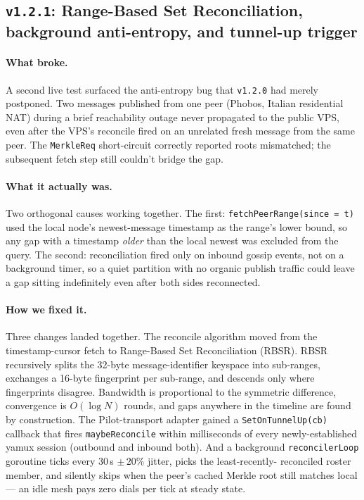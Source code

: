 \documentclass[11pt,a4paper]{article}
\begin{document}
\subsection{\texttt{v1.2.1}: Range-Based Set Reconciliation,
background anti-entropy, and tunnel-up trigger}

\paragraph{What broke.} A second live test surfaced the
anti-entropy bug that \texttt{v1.2.0} had merely postponed. Two
messages published from one peer (Phobos, Italian residential
NAT) during a brief reachability outage never propagated to the
public VPS, even after the VPS's reconcile fired on an unrelated
fresh message from the same peer. The \texttt{MerkleReq}
short-circuit correctly reported roots mismatched; the
subsequent fetch step still couldn't bridge the gap.

\paragraph{What it actually was.} Two orthogonal causes working
together. The first: \texttt{fetchPeerRange(since = t)} used
the local node's newest-message timestamp as the range's lower
bound, so any gap with a timestamp \emph{older} than the local
newest was excluded from the query. The second: reconciliation
fired only on inbound gossip events, not on a background timer,
so a quiet partition with no organic publish traffic could leave
a gap sitting indefinitely even after both sides reconnected.

\paragraph{How we fixed it.} Three changes landed together. The
reconcile algorithm moved from the timestamp-cursor fetch to
Range-Based Set Reconciliation (RBSR). RBSR recursively splits
the 32-byte message-identifier keyspace into sub-ranges,
exchanges a 16-byte fingerprint per sub-range, and descends only
where fingerprints disagree. Bandwidth is proportional to the
symmetric difference, convergence is $O(\log N)$ rounds, and
gaps anywhere in the timeline are found by construction. The
Pilot-transport adapter gained a \texttt{SetOnTunnelUp(cb)}
callback that fires \texttt{maybeReconcile} within milliseconds
of every newly-established yamux session (outbound and inbound
both). And a background \texttt{reconcilerLoop} goroutine ticks
every 30\,s $\pm\,20\%$ jitter, picks the least-recently-
reconciled roster member, and silently skips when the peer's
cached Merkle root still matches local --- an idle mesh pays
zero dials per tick at steady state.
\end{document}
